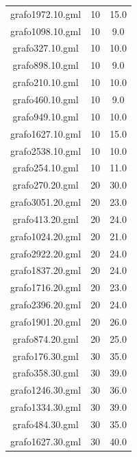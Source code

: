 \documentclass[bachelor, english]{algothesis}
\begin{document}
\begin{minipage}{0.5\textwidth}
\begin{xtabular}{|c|c|c|}
grafo1972.10.gml & 10 & 15.0 \\
grafo1098.10.gml & 10 & 9.0 \\
grafo327.10.gml & 10 & 10.0 \\
grafo898.10.gml & 10 & 9.0 \\
grafo210.10.gml & 10 & 10.0 \\
grafo460.10.gml & 10 & 9.0 \\
grafo949.10.gml & 10 & 10.0 \\
grafo1627.10.gml & 10 & 15.0 \\
grafo2538.10.gml & 10 & 10.0 \\
grafo254.10.gml & 10 & 11.0 \\
\hline
grafo270.20.gml & 20 & 30.0 \\
grafo3051.20.gml & 20 & 23.0 \\
grafo413.20.gml & 20 & 24.0 \\
grafo1024.20.gml & 20 & 21.0 \\
grafo2922.20.gml & 20 & 24.0 \\
grafo1837.20.gml & 20 & 24.0 \\
grafo1716.20.gml & 20 & 23.0 \\
grafo2396.20.gml & 20 & 24.0 \\
grafo1901.20.gml & 20 & 26.0 \\
grafo874.20.gml & 20 & 25.0 \\
\hline
grafo176.30.gml & 30 & 35.0 \\
grafo358.30.gml & 30 & 39.0 \\
grafo1246.30.gml & 30 & 36.0 \\
grafo1334.30.gml & 30 & 39.0 \\
grafo484.30.gml & 30 & 35.0 \\
grafo1627.30.gml & 30 & 40.0 \\
\end{xtabular}
\end{minipage}%
\end{document}
